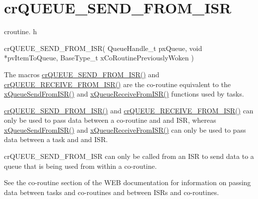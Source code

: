 \hypertarget{group__cr_q_u_e_u_e___s_e_n_d___f_r_o_m___i_s_r}{}\section{cr\+Q\+U\+E\+U\+E\+\_\+\+S\+E\+N\+D\+\_\+\+F\+R\+O\+M\+\_\+\+I\+SR}
\label{group__cr_q_u_e_u_e___s_e_n_d___f_r_o_m___i_s_r}
croutine. h 
\begin{DoxyPre}
 crQUEUE\_SEND\_FROM\_ISR(
                           QueueHandle\_t pxQueue,
                           void *pvItemToQueue,
                           BaseType\_t xCoRoutinePreviouslyWoken
                      )\end{DoxyPre}


The macro\textquotesingle{}s \hyperlink{croutine_8h_ac8eb0a81c5cf69de7e4edd73ce44a3be}{cr\+Q\+U\+E\+U\+E\+\_\+\+S\+E\+N\+D\+\_\+\+F\+R\+O\+M\+\_\+\+I\+S\+R()} and \hyperlink{croutine_8h_a9c0fa977ca69adbddb4811affa2a71f7}{cr\+Q\+U\+E\+U\+E\+\_\+\+R\+E\+C\+E\+I\+V\+E\+\_\+\+F\+R\+O\+M\+\_\+\+I\+S\+R()} are the co-\/routine equivalent to the \hyperlink{queue_8h_a21d5919ed26c21d121df4a4debeb643c}{x\+Queue\+Send\+From\+I\+S\+R()} and \hyperlink{queue_8h_acdf528f5c91131ae2f31c669cfd65758}{x\+Queue\+Receive\+From\+I\+S\+R()} functions used by tasks.

\hyperlink{croutine_8h_ac8eb0a81c5cf69de7e4edd73ce44a3be}{cr\+Q\+U\+E\+U\+E\+\_\+\+S\+E\+N\+D\+\_\+\+F\+R\+O\+M\+\_\+\+I\+S\+R()} and \hyperlink{croutine_8h_a9c0fa977ca69adbddb4811affa2a71f7}{cr\+Q\+U\+E\+U\+E\+\_\+\+R\+E\+C\+E\+I\+V\+E\+\_\+\+F\+R\+O\+M\+\_\+\+I\+S\+R()} can only be used to pass data between a co-\/routine and and I\+SR, whereas \hyperlink{queue_8h_a21d5919ed26c21d121df4a4debeb643c}{x\+Queue\+Send\+From\+I\+S\+R()} and \hyperlink{queue_8h_acdf528f5c91131ae2f31c669cfd65758}{x\+Queue\+Receive\+From\+I\+S\+R()} can only be used to pass data between a task and and I\+SR.

cr\+Q\+U\+E\+U\+E\+\_\+\+S\+E\+N\+D\+\_\+\+F\+R\+O\+M\+\_\+\+I\+SR can only be called from an I\+SR to send data to a queue that is being used from within a co-\/routine.

See the co-\/routine section of the W\+EB documentation for information on passing data between tasks and co-\/routines and between I\+SR\textquotesingle{}s and co-\/routines.


